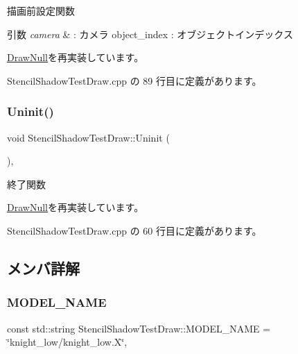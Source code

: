 描画前設定関数 


\begin{DoxyParams}{引数}
{\em camera} & \+: カメラ object\+\_\+index \+: オブジェクトインデックス \\
\hline
\end{DoxyParams}


\mbox{\hyperlink{class_draw_null_a7f0d52c5c2fb2d9b8eb423f363862290}{Draw\+Null}}を再実装しています。



 Stencil\+Shadow\+Test\+Draw.\+cpp の 89 行目に定義があります。

\mbox{\label{class_stencil_shadow_test_draw_ad0672bf4ecfc8091cf54ed6f2c76b618}} 
\subsubsection{\texorpdfstring{Uninit()}{Uninit()}}
{\footnotesize\ttfamily void Stencil\+Shadow\+Test\+Draw\+::\+Uninit (\begin{DoxyParamCaption}{ }\end{DoxyParamCaption})\hspace{0.3cm}{\ttfamily [override]}, {\ttfamily [virtual]}}



終了関数 



\mbox{\hyperlink{class_draw_null_a12d44e341c7364b5ab9cdd661dc16187}{Draw\+Null}}を再実装しています。



 Stencil\+Shadow\+Test\+Draw.\+cpp の 60 行目に定義があります。



\subsection{メンバ詳解}
\mbox{\label{class_stencil_shadow_test_draw_a1ef49214f41a9fa1f3c2a7616eaf5655}} 
\subsubsection{\texorpdfstring{M\+O\+D\+E\+L\+\_\+\+N\+A\+ME}{MODEL\_NAME}}
{\footnotesize\ttfamily const std\+::string Stencil\+Shadow\+Test\+Draw\+::\+M\+O\+D\+E\+L\+\_\+\+N\+A\+ME = \char`\"{}knight\+\_\+low/knight\+\_\+low.\+X\char`\"{}\hspace{0.3cm}{\ttfamily [static]}, {\ttfamily [private]}}



